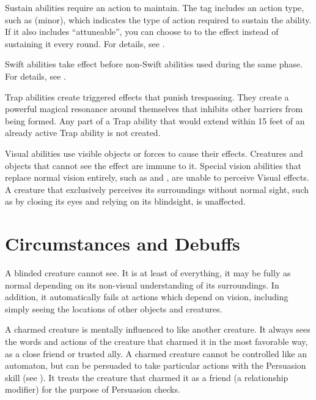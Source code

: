      Sustain abilities require an action to maintain.
    The tag includes an action type, such as (minor), which indicates the type of action required to sustain the ability.
    If it also includes ``attuneable'', you can choose to  to the effect instead of sustaining it every round.
    For details, see .

     Swift abilities take effect before non-Swift abilities used during the same phase.
    For details, see .

     Trap abilities create triggered effects that punish trespassing.
    They create a powerful magical resonance around themselves that inhibits other barriers from being formed.
    Any part of a Trap ability that would extend within 15 feet of an already active Trap ability is not created.

     Visual abilities use visible objects or forces to cause their effects.
    Creatures and objects that cannot see the effect are immune to it.
    Special vision abilities that replace normal vision entirely, such as  and , are unable to perceive Visual effects.
    A creature that exclusively perceives its surroundings without normal sight, such as by closing its eyes and relying on its blindsight, is unaffected.

\newpage
\section{Circumstances and Debuffs}\label{Circumstances and Debuffs}

     A blinded creature cannot see.
    It is at least \partiallyunaware of everything, it may be fully \unaware as normal depending on its non-visual understanding of its surroundings.
    In addition, it automatically fails at actions which depend on vision, including simply seeing the locations of other objects and creatures.

     A charmed creature is mentally influenced to like another creature.
    It always sees the words and actions of the creature that charmed it in the most favorable way, as a close friend or trusted ally.
    A charmed creature cannot be controlled like an automaton, but can be persuaded to take particular actions with the Persuasion skill (see ).
    It treats the creature that charmed it as a friend (a  relationship modifier) for the purpose of Persuasion checks.


